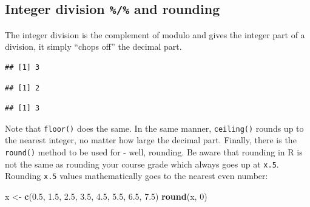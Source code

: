 \documentclass[]{book}
\newenvironment{Shaded}{\begin{snugshade}}{\end{snugshade}}
\newcommand{\DecValTok}[1]{\textcolor[rgb]{0.00,0.00,0.81}{#1}}
\newcommand{\FloatTok}[1]{\textcolor[rgb]{0.00,0.00,0.81}{#1}}
\newcommand{\KeywordTok}[1]{\textcolor[rgb]{0.13,0.29,0.53}{\textbf{#1}}}
\newcommand{\NormalTok}[1]{#1}
\newcommand{\OperatorTok}[1]{\textcolor[rgb]{0.81,0.36,0.00}{\textbf{#1}}}
\newcommand{\StringTok}[1]{\textcolor[rgb]{0.31,0.60,0.02}{#1}}
\begin{document}
\hypertarget{integer-division-and-rounding}{%
\subsection{\texorpdfstring{Integer division \texttt{\%/\%} and rounding}{Integer division \%/\% and rounding}}\label{integer-division-and-rounding}}

The integer division is the complement of modulo and gives the integer part of a division, it simply ``chops off'' the decimal part.

\begin{Shaded}
\end{Shaded}

\begin{verbatim}
## [1] 3
\end{verbatim}

\begin{Shaded}
\end{Shaded}

\begin{verbatim}
## [1] 2
\end{verbatim}

\begin{Shaded}
\end{Shaded}

\begin{verbatim}
## [1] 3
\end{verbatim}

Note that \texttt{floor()} does the same. In the same manner, \texttt{ceiling()} rounds up to the nearest integer, no matter how large the decimal part. Finally, there is the \texttt{round()} method to be used for - well, rounding. Be aware that rounding in R is not the same as rounding your course grade which always goes up at \texttt{x.5}. Rounding \texttt{x.5} values mathematically goes to the nearest even number:

\begin{Shaded}
\begin{Highlighting}[]
\NormalTok{x <-}\StringTok{ }\KeywordTok{c}\NormalTok{(}\FloatTok{0.5}\NormalTok{, }\FloatTok{1.5}\NormalTok{, }\FloatTok{2.5}\NormalTok{, }\FloatTok{3.5}\NormalTok{, }\FloatTok{4.5}\NormalTok{, }\FloatTok{5.5}\NormalTok{, }\FloatTok{6.5}\NormalTok{, }\FloatTok{7.5}\NormalTok{)}
\KeywordTok{round}\NormalTok{(x, }\DecValTok{0}\NormalTok{)}
\end{Highlighting}
\end{Shaded}
\end{document}
